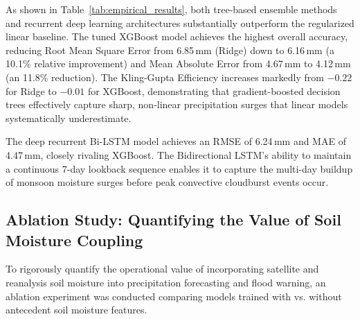 \documentclass[journal]{IEEEtran}
\begin{document}
\begin{table}[htbp]
\centering
\caption{Empirical Model Performance Comparison for 24-Hour Forward Lead-Time Precipitation Forecasting in Nepal}
\label{tab:empirical_results}
\end{table}

As shown in Table~\ref{tab:empirical_results}, both tree-based ensemble methods and recurrent deep learning architectures substantially outperform the regularized linear baseline. The tuned XGBoost model achieves the highest overall accuracy, reducing Root Mean Square Error from 6.85\,mm (Ridge) down to 6.16\,mm (a 10.1\% relative improvement) and Mean Absolute Error from 4.67\,mm to 4.12\,mm (an 11.8\% reduction). The Kling-Gupta Efficiency increases markedly from $-0.22$ for Ridge to $-0.01$ for XGBoost, demonstrating that gradient-boosted decision trees effectively capture sharp, non-linear precipitation surges that linear models systematically underestimate.

The deep recurrent Bi-LSTM model achieves an RMSE of 6.24\,mm and MAE of 4.47\,mm, closely rivaling XGBoost. The Bidirectional LSTM's ability to maintain a continuous 7-day lookback sequence enables it to capture the multi-day buildup of monsoon moisture surges before peak convective cloudburst events occur.

\subsection{Ablation Study: Quantifying the Value of Soil Moisture Coupling}
To rigorously quantify the operational value of incorporating satellite and reanalysis soil moisture into precipitation forecasting and flood warning, an ablation experiment was conducted comparing models trained with vs. without antecedent soil moisture features.
\end{document}

